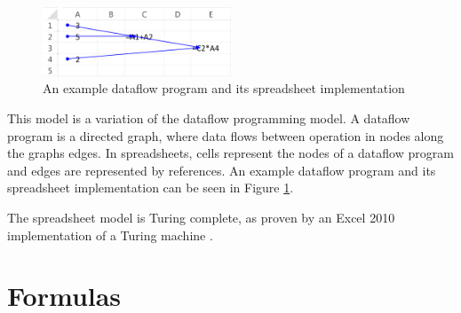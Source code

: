 \begin{figure}
\caption{An example dataflow program and its spreadsheet implementation}
\label{fig:dataflow-example}
\centerfloat
{}\hspace{4em}
\includegraphics[width=0.5\textwidth]{anatomy/dataflow-program-excel-implementation}
\end{figure}

This model is a variation of the dataflow programming model.
A dataflow program is a directed graph, where data flows between operation in nodes along the graphs edges.
In spreadsheets, cells represent the nodes of a dataflow program and edges are represented by references.
An example dataflow program and its spreadsheet implementation can be seen in Figure \ref{fig:dataflow-example}.

The spreadsheet model is Turing complete, as proven by an Excel 2010 implementation of a Turing machine \cite{ExcelTuringComplete}.

\section{Formulas}

